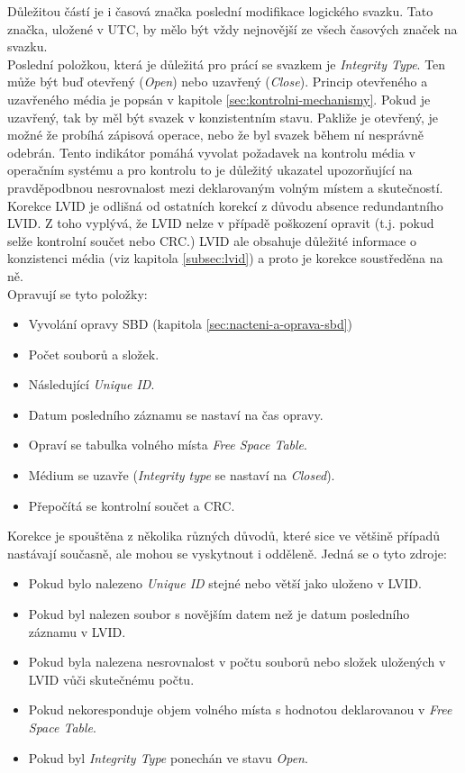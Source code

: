 Důležitou částí je i časová značka poslední modifikace logického svazku. Tato značka, uložené v UTC, by mělo být vždy nejnovější ze všech časových značek na svazku.\\
Poslední položkou, která je důležitá pro prácí se svazkem je \textit{Integrity Type}. Ten může být buď otevřený (\textit{Open}) nebo uzavřený (\textit{Close}). Princip otevřeného a uzavřeného média je popsán v kapitole \ref{sec:kontrolni-mechanismy}. Pokud je uzavřený, tak by měl být svazek v konzistentním stavu. Pakliže je otevřený, je možné že probíhá zápisová operace, nebo že byl svazek během ní nesprávně odebrán. Tento indikátor pomáhá vyvolat požadavek na kontrolu média v operačním systému a pro kontrolu to je důležitý ukazatel upozorňující na pravděpodbnou nesrovnalost mezi deklarovaným volným místem a skutečností. 
Korekce LVID je odlišná od ostatních korekcí z důvodu absence redundantního LVID. Z toho vyplývá, že LVID nelze v případě poškození opravit (t.j. pokud selže kontrolní součet nebo CRC.) LVID ale obsahuje důležité informace o konzistenci média (viz kapitola \ref{subsec:lvid}) a proto je korekce soustředěna na ně.\\
Opravují se tyto položky:
\begin{itemize}
    \item Vyvolání opravy SBD (kapitola \ref{sec:nacteni-a-oprava-sbd})
    \item Počet souborů a složek.
    \item Následující \textit{Unique ID}.
    \item Datum posledního záznamu se nastaví na čas opravy.
    \item Opraví se tabulka volného místa \textit{Free Space Table}.
    \item Médium se uzavře (\textit{Integrity type} se nastaví na \textit{Closed}).
    \item Přepočítá se kontrolní součet a CRC.
\end{itemize}
Korekce je spouštěna z několika různých důvodů, které sice ve většině případů nastávají současně, ale mohou se vyskytnout i odděleně. Jedná se o tyto zdroje:
\begin{itemize}
    \item Pokud bylo nalezeno \textit{Unique ID} stejné nebo větší jako uloženo v LVID.
    \item Pokud byl nalezen soubor s novějším datem než je datum posledního záznamu v LVID.
    \item Pokud byla nalezena nesrovnalost v počtu souborů nebo složek uložených v LVID vůči skutečnému počtu.
    \item Pokud nekoresponduje objem volného místa s hodnotou deklarovanou v \textit{Free Space Table}.
    \item Pokud byl \textit{Integrity Type} ponechán ve stavu \textit{Open}.
\end{itemize}

